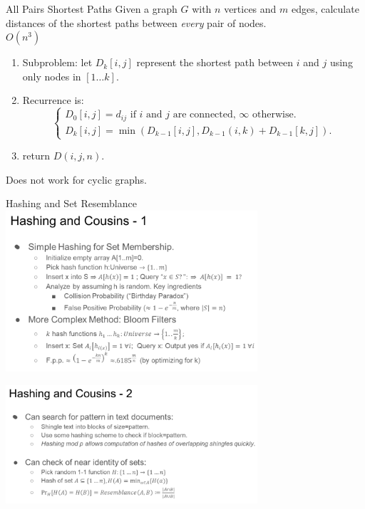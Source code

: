 \documentclass[10pt,a4paper]{article}
\begin{document}
\begin{multicols}{3}
    \begin{textbox}{All Pairs Shortest Paths}
        Given a graph $G$ with $n$ vertices and $m$ edges, calculate distances of the shortest paths between {\em every} pair of nodes. \\
          $O(n^3)$
        \begin{enumerate}
            \item Subproblem: let $D_k[i,j]$ represent the shortest path between $i$ and $j$ using only nodes in $[1\ldots k]$.
            \item Recurrence is:
                  \[\begin{cases}
                          D_0[i,j] = d_{ij} \text{ if } i \text{ and } j \text{ are connected, } \infty \text{ otherwise}. \\
                          D_k[i,j] = \min(D_{k - 1}[i,j], D_{k - 1}(i,k)+D_{k - 1}[k,j]).
                      \end{cases}\]
            \item return $D(i,j,n)$.
        \end{enumerate}
         Does not work for cyclic graphs.
    \end{textbox}

    \begin{textbox}{Hashing and Set Resemblance}
        \includegraphics[width=0.7\textwidth]{images/Hashing1.png}

        \includegraphics[width=0.7\textwidth]{images/Hashing2.png}



\end{textbox}
\end{multicols}
\end{document}
